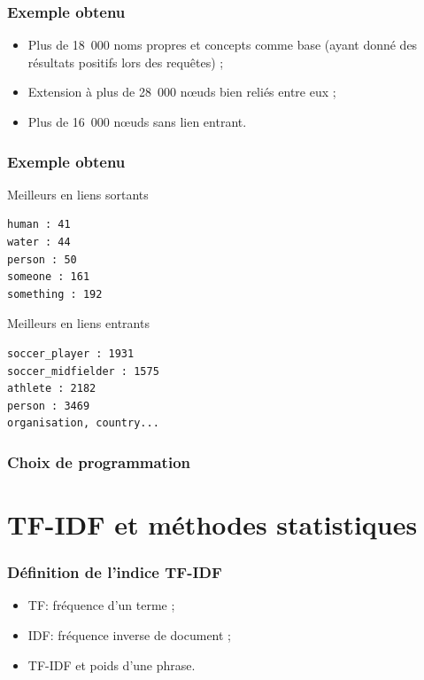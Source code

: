 \documentclass[12pt, handout]{beamer}
\begin{document}
\begin{frame}
  \frametitle{Exemple obtenu}
  
  \begin{itemize}
   \item Plus de 18~000 noms propres et concepts comme base (ayant donné des résultats positifs lors des requêtes) ;
   \item Extension à plus de 28~000 n\oe uds bien reliés entre eux ;
   \item Plus de 16~000 n\oe uds sans lien entrant.
  \end{itemize}

  
\end{frame}

\begin{frame}[fragile]
 \frametitle{Exemple obtenu}
 
 \begin{block}{Meilleurs en liens sortants}
  \begin{verbatim}
human : 41
water : 44
person : 50
someone : 161
something : 192 
  \end{verbatim}
 \end{block}

  \begin{block}{Meilleurs en liens entrants}
    \begin{verbatim}
soccer_player : 1931
soccer_midfielder : 1575
athlete : 2182
person : 3469
organisation, country...
    \end{verbatim}
  \end{block}
\end{frame}


\begin{frame}
 \frametitle{Choix de programmation}
 
 
\end{frame}



\section{TF-IDF et méthodes statistiques}


\begin{frame}
 \frametitle{Définition de l'indice TF-IDF}
 \begin{itemize}
  \item TF: fréquence d'un terme ;
  \item IDF: fréquence inverse de document ;
  \item TF-IDF et poids d'une phrase.
 \end{itemize}
 
\end{frame}
\end{document}
